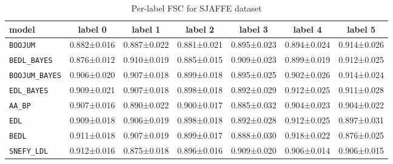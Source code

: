\begin{table}[h]
\centering
\caption{Per-label FSC for SJAFFE dataset}
\label{tab:sjaffe_per_label_fsc}

\begin{tabular}{lcccccc}
\toprule
\textbf{model} & \textbf{label 0} & \textbf{label 1} & \textbf{label 2} & \textbf{label 3} & \textbf{label 4} & \textbf{label 5} \\
\midrule
\texttt{BOOJUM} & 0.882±0.016 & 0.887±0.022 & 0.881±0.021 & 0.895±0.023 & 0.894±0.024 & 0.914±0.026 \\
\texttt{BEDL\_BAYES} & 0.876±0.012 & 0.910±0.019 & 0.885±0.015 & 0.909±0.023 & 0.899±0.019 & 0.912±0.025 \\
\texttt{BOOJUM\_BAYES} & 0.906±0.020 & 0.907±0.018 & 0.899±0.018 & 0.895±0.025 & 0.902±0.026 & 0.914±0.024 \\
\texttt{EDL\_BAYES} & 0.909±0.021 & 0.907±0.018 & 0.898±0.018 & 0.892±0.029 & 0.912±0.025 & 0.911±0.028 \\
\texttt{AA\_BP} & 0.907±0.016 & 0.890±0.022 & 0.900±0.017 & 0.885±0.032 & 0.904±0.023 & 0.904±0.022 \\
\texttt{EDL} & 0.909±0.018 & 0.906±0.019 & 0.898±0.018 & 0.892±0.028 & 0.912±0.025 & 0.897±0.031 \\
\texttt{BEDL} & 0.911±0.018 & 0.907±0.019 & 0.899±0.017 & 0.888±0.030 & 0.918±0.022 & 0.876±0.025 \\
\texttt{SNEFY\_LDL} & 0.912±0.016 & 0.875±0.018 & 0.896±0.016 & 0.909±0.020 & 0.906±0.014 & 0.906±0.015 \\
\bottomrule
\end{tabular}

\end{table}